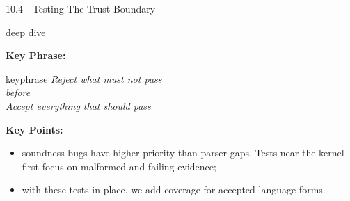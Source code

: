 \documentclass[aspectratio=169,11pt]{beamer}
\newcommand{\deepdivetag}{\hfill\colorbox{black!15}{\textcolor{black!65}{\strut\scriptsize\sffamily deep dive}}}
\begin{document}
\begin{frame}[fragile,t]{10.4 - Testing The Trust Boundary\deepdivetag}
\smallskip
\textbf{Key Phrase:}
\begin{center}
\begin{beamercolorbox}[rounded=true,sep=2.5mm,wd=0.9\textwidth]{keyphrase}
\centering\itshape Reject what must not pass\\ before\\ Accept everything that should pass
\end{beamercolorbox}
\end{center}
\smallskip
\textbf{Key Points:}
\begin{itemize}
\setlength{\itemsep}{1pt}
\setlength{\parsep}{0pt}
\setlength{\parskip}{0pt}
\item soundness bugs have higher priority than parser gaps. Tests near the kernel first focus on malformed and failing evidence;
\item with these tests in place, we add coverage for accepted language forms.
\end{itemize}
\end{frame}
\end{document}
